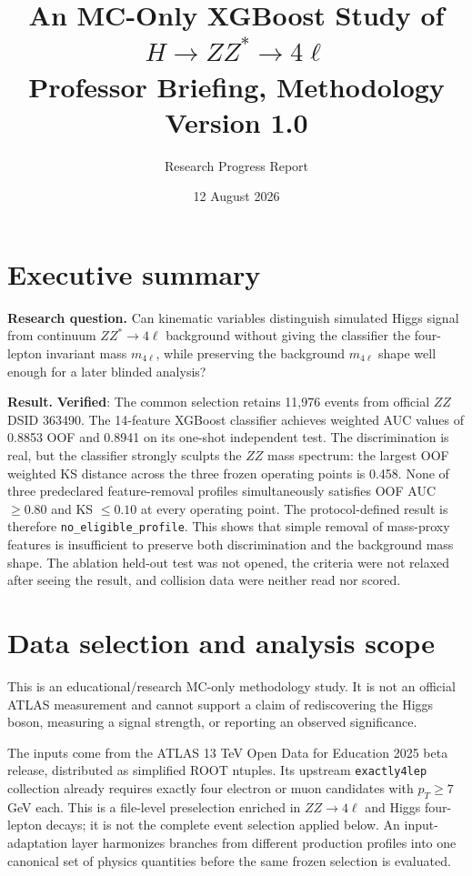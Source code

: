 \documentclass[11pt,a4paper]{article}
\title{An MC-Only XGBoost Study of $H\to ZZ^{*}\to4\ell$\\\large Professor Briefing, Methodology Version 1.0}
\author{Research Progress Report}
\date{12 August 2026}
\newcommand{\verified}{\textcolor{verified}{\textbf{Verified}}}
\begin{document}
\maketitle

\section*{Executive summary}

\textbf{Research question.} Can kinematic variables distinguish simulated Higgs signal from continuum $ZZ^{*}\to4\ell$ background without giving the classifier the four-lepton invariant mass $m_{4\ell}$, while preserving the background $m_{4\ell}$ shape well enough for a later blinded analysis?

\textbf{Result.} \verified: The common selection retains 11,976 events from official $ZZ$ DSID 363490. The 14-feature XGBoost classifier achieves weighted AUC values of 0.8853 OOF and 0.8941 on its one-shot independent test. The discrimination is real, but the classifier strongly sculpts the $ZZ$ mass spectrum: the largest OOF weighted KS distance across the three frozen operating points is 0.458. None of three predeclared feature-removal profiles simultaneously satisfies OOF AUC $\geq0.80$ and KS $\leq0.10$ at every operating point. The protocol-defined result is therefore \texttt{no\_eligible\_profile}. This shows that simple removal of mass-proxy features is insufficient to preserve both discrimination and the background mass shape. The ablation held-out test was not opened, the criteria were not relaxed after seeing the result, and collision data were neither read nor scored.

\section{Data selection and analysis scope}

This is an educational/research MC-only methodology study. It is not an official ATLAS measurement and cannot support a claim of rediscovering the Higgs boson, measuring a signal strength, or reporting an observed significance.

The inputs come from the ATLAS 13 TeV Open Data for Education 2025 beta release, distributed as simplified ROOT ntuples. Its upstream \texttt{exactly4lep} collection already requires exactly four electron or muon candidates with $p_T\geq7$ GeV each. This is a file-level preselection enriched in $ZZ\to4\ell$ and Higgs four-lepton decays; it is not the complete event selection applied below\cite{atlas-open-data-2025}. An input-adaptation layer harmonizes branches from different production profiles into one canonical set of physics quantities before the same frozen selection is evaluated.
\end{document}
